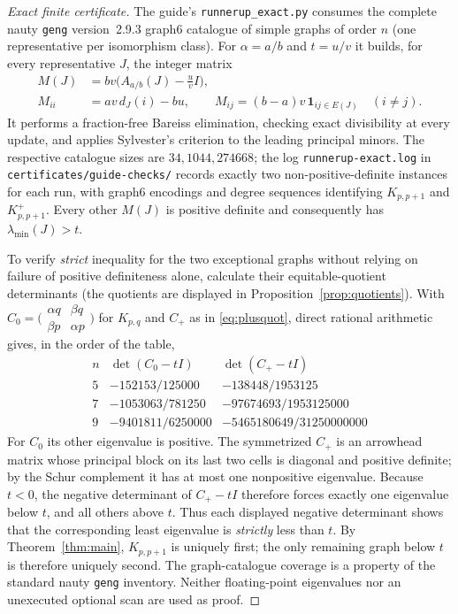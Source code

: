 \documentclass[11pt]{amsart}
\theoremstyle{definition}
\newcommand{\lam}{\lambda_{\min}}
\begin{document}
\begin{proof}[Exact finite certificate]
The guide's \texttt{runnerup\_exact.py} consumes the complete nauty \texttt{geng} version~2.9.3 graph6 catalogue of simple graphs of order $n$ (one representative per isomorphism class). For $\alpha=a/b$ and $t=u/v$ it builds, for every representative $J$, the integer matrix
\[
\begin{aligned}
M(J)&=bv\bigl(A_{a/b}(J)-\tfrac uv I\bigr),\\
M_{ii}&=av\,d_J(i)-bu,\qquad
M_{ij}=(b-a)v\,\mathbf{1}_{ij\in E(J)}\quad(i\ne j).
\end{aligned}
\]
It performs a fraction-free Bareiss elimination, checking exact divisibility at every update, and applies Sylvester's criterion to the leading principal minors. The respective catalogue sizes are $34,1044,274668$; the log \texttt{runnerup-exact.log} in \texttt{certificates/guide-checks/} records exactly two non-positive-definite instances for each run, with graph6 encodings and degree sequences identifying $K_{p,p+1}$ and $K_{p,p+1}^{+}$. Every other $M(J)$ is positive definite and consequently has $\lam(J)>t$.

To verify \emph{strict} inequality for the two exceptional graphs without relying on failure of positive definiteness alone, calculate their equitable-quotient determinants (the quotients are displayed in Proposition~\ref{prop:quotients}). With $C_0=\bigl(\begin{smallmatrix}\alpha q&\beta q\\\beta p&\alpha p\end{smallmatrix}\bigr)$ for $K_{p,q}$ and $C_+$ as in \eqref{eq:plusquot}, direct rational arithmetic gives, in the order of the table,
\[
\begin{array}{c|cc}
 n&\det(C_0-tI)&\det(C_+-tI)\\\hline
5&-152153/125000&-138448/1953125\\
7&-1053063/781250&-97674693/1953125000\\
9&-9401811/6250000&-5465180649/31250000000
\end{array}
\]
For $C_0$ its other eigenvalue is positive. The symmetrized $C_+$ is an arrowhead matrix whose principal block on its last two cells is diagonal and positive definite; by the Schur complement it has at most one nonpositive eigenvalue. Because $t<0$, the negative determinant of $C_+-tI$ therefore forces exactly one eigenvalue below $t$, and all others above $t$. Thus each displayed negative determinant shows that the corresponding least eigenvalue is \emph{strictly} less than $t$. By Theorem~\ref{thm:main}, $K_{p,p+1}$ is uniquely first; the only remaining graph below $t$ is therefore uniquely second. The graph-catalogue coverage is a property of the standard nauty \texttt{geng} inventory. Neither floating-point eigenvalues nor an unexecuted optional scan are used as proof.
\end{proof}
\end{document}
